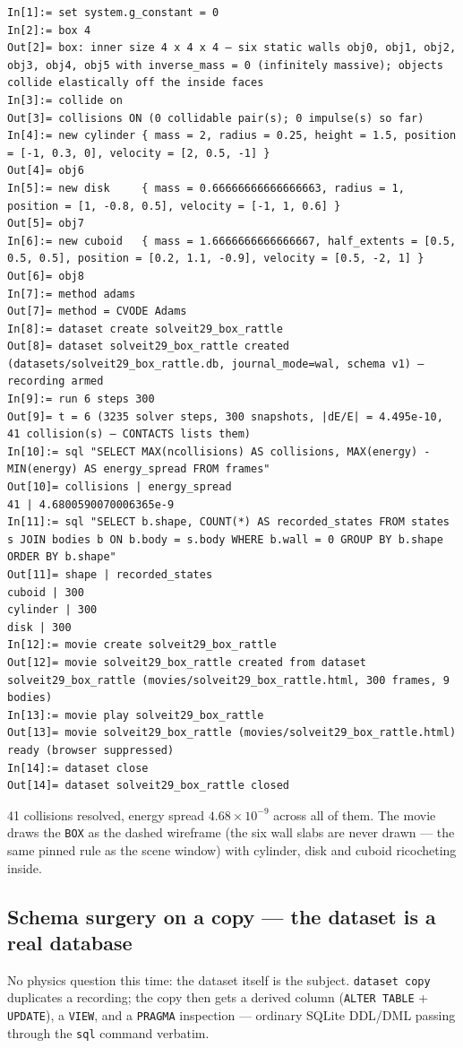 \documentclass[11pt]{article}
\newcommand{\kw}[1]{\texttt{\uppercase{#1}}}
\newcommand{\code}[1]{\texttt{#1}}
\begin{document}
\begin{lstlisting}
In[1]:= set system.g_constant = 0
In[2]:= box 4
Out[2]= box: inner size 4 x 4 x 4 — six static walls obj0, obj1, obj2, obj3, obj4, obj5 with inverse_mass = 0 (infinitely massive); objects collide elastically off the inside faces
In[3]:= collide on
Out[3]= collisions ON (0 collidable pair(s); 0 impulse(s) so far)
In[4]:= new cylinder { mass = 2, radius = 0.25, height = 1.5, position = [-1, 0.3, 0], velocity = [2, 0.5, -1] }
Out[4]= obj6
In[5]:= new disk     { mass = 0.66666666666666663, radius = 1, position = [1, -0.8, 0.5], velocity = [-1, 1, 0.6] }
Out[5]= obj7
In[6]:= new cuboid   { mass = 1.6666666666666667, half_extents = [0.5, 0.5, 0.5], position = [0.2, 1.1, -0.9], velocity = [0.5, -2, 1] }
Out[6]= obj8
In[7]:= method adams
Out[7]= method = CVODE Adams
In[8]:= dataset create solveit29_box_rattle
Out[8]= dataset solveit29_box_rattle created (datasets/solveit29_box_rattle.db, journal_mode=wal, schema v1) — recording armed
In[9]:= run 6 steps 300
Out[9]= t = 6 (3235 solver steps, 300 snapshots, |dE/E| = 4.495e-10, 41 collision(s) — CONTACTS lists them)
In[10]:= sql "SELECT MAX(ncollisions) AS collisions, MAX(energy) - MIN(energy) AS energy_spread FROM frames"
Out[10]= collisions | energy_spread
41 | 4.6800590070006365e-9
In[11]:= sql "SELECT b.shape, COUNT(*) AS recorded_states FROM states s JOIN bodies b ON b.body = s.body WHERE b.wall = 0 GROUP BY b.shape ORDER BY b.shape"
Out[11]= shape | recorded_states
cuboid | 300
cylinder | 300
disk | 300
In[12]:= movie create solveit29_box_rattle
Out[12]= movie solveit29_box_rattle created from dataset solveit29_box_rattle (movies/solveit29_box_rattle.html, 300 frames, 9 bodies)
In[13]:= movie play solveit29_box_rattle
Out[13]= movie solveit29_box_rattle (movies/solveit29_box_rattle.html) ready (browser suppressed)
In[14]:= dataset close
Out[14]= dataset solveit29_box_rattle closed
\end{lstlisting}

41 collisions resolved, energy spread $4.68\times10^{-9}$ across all
of them. The movie draws the
\kw{box} as the dashed wireframe (the six wall slabs are never drawn
--- the same pinned rule as the scene window) with cylinder, disk and
cuboid ricocheting inside.

\subsection{Schema surgery on a copy --- the dataset is a real database}

No physics question this time: the dataset itself is the subject.
\code{dataset copy} duplicates a recording; the copy then gets a
derived column (\code{ALTER TABLE} + \code{UPDATE}), a \code{VIEW},
and a \code{PRAGMA} inspection --- ordinary SQLite DDL/DML passing
through the \code{sql} command verbatim.
\end{document}

